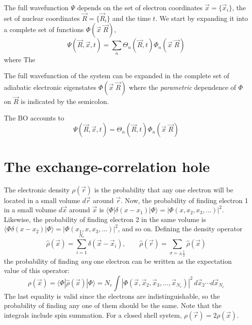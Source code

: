 \documentclass[11pt,bibliography=totoc,index=totoc]{scrbook}   %
\begin{document}
The full wavefunction $\Psi$ depends on the set of electron coordinates $\vec{x}=\{\vec{x}_i\}$, the set of nuclear coordinates $\vec{R}=\{\vec{R}_i\}$ and the time $t$.
We start by expanding it into a complete set of functions $\Phi(\vec{x}\;\vec{R})$,
\begin{equation}
  \Psi(\vec{R},\vec{x},t) = \sum_n \Theta_n(\vec{R},t)\Phi_n(\vec{x}\;\vec{R})
\end{equation}
where 
The 

The full wavefunction of the system can be expanded in the complete set of adiabatic electronic eigenstates $\Phi(\vec{x}\;\vec{R})$
where the \emph{parametric} dependence of $\Phi$ on $\vec{R}$ is indicated by the semicolon.

The BO accounts to
\begin{equation}
  \Psi(\vec{R},\vec{x},t) = \Theta_n(\vec{R},t)\Phi_n(\vec{x}\;\vec{R})
\end{equation}

\section{The exchange-correlation hole}

The electronic density $\rho(\vec{r})$ is the probability that any one electron will be located in a small volume $d\vec{r}$ 
around $\vec{r}$.
Now, the probability of finding electron 1 in a small volume $d\vec{x}$ around $\vec{x}$ is $\langle\Phi|\delta(x-x_1)|\Phi\rangle = |\Phi(x,x_2,x_3,\ldots)|^2$. 
Likewise, the probability of finding electron 2 in the same volume is $\langle\Phi\delta(x-x_2)|\Phi\rangle = |\Phi(x_1,x,x_3,\ldots)|^2$, and so on.
Defining the density operator
\begin{equation}
  \hat{\rho}(\vec{x}) =\sum_{i=1}^{N_e} \delta(\vec{x}-\vec{x}_i),\qquad
  \hat{\rho}(\vec{r}) = \sum_{\sigma=\pm\frac12} \hat{\rho}(\vec{x})
\end{equation}
the probability of finding \emph{any} one electron can be written as the expectation value of this operator:
\begin{equation}
  \rho(\vec{x}) = \langle \Phi | \hat{\rho}(\vec{x}) | \Phi\rangle 
  = N_e \int |\Phi(\vec{x},\vec{x}_2,\vec{x}_3,\ldots,\vec{x}_{N_e} )|^2
 \,d\vec{x}_2\cdots d\vec{x}_{N_e}
\end{equation}
The last equality is valid since the electrons are indistinguishable, so the probability of finding any one of them should be the same.
Note that the integrals include spin summation. For a closed shell system, $\rho(\vec{r}) = 2 \rho(\vec{x})$.
\end{document}
